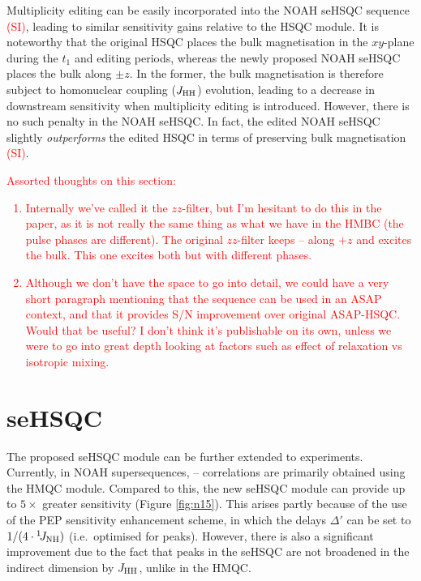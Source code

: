 \documentclass[11pt]{article}
\newcommand*{\carbon}{\ce{^{13}C}}
\newcommand*{\proton}{\ce{^{1}H}}
\newcommand*{\nitrogen}{\ce{^{15}N}}
\newcommand*{\red}[1]{\textcolor{red}{#1}}
\newcommand*{\onejnh}{{}^{1}\!J_{\ce{NH}}}
\newcommand*{\jhh}{J_{\ce{HH}}}
\newcommand*{\figref}[1]{Figure \ref{fig:#1}}
\newcommand*{\sitodo}{\red{(SI)}}
\begin{document}
Multiplicity editing can be easily incorporated into the NOAH seHSQC sequence \sitodo{}, leading to similar sensitivity gains relative to the HSQC module.
It is noteworthy that the original HSQC places the bulk magnetisation in the $xy$-plane during the $t_1$ and editing periods, whereas the newly proposed NOAH seHSQC places the bulk along $\pm z$.
In the former, the bulk magnetisation is therefore subject to homonuclear coupling ($\jhh$) evolution, leading to a decrease in downstream sensitivity when multiplicity editing is introduced.
However, there is no such penalty in the NOAH seHSQC.
In fact, the edited NOAH seHSQC slightly \textit{outperforms} the edited HSQC in terms of preserving bulk magnetisation \sitodo{}.

\red{
    Assorted thoughts on this section:
    \begin{enumerate}
        \item Internally we've called it the $zz$-filter, but I'm hesitant to do this in the paper, as it is not really the same thing as what we have in the HMBC (the pulse phases are different). The original $zz$-filter keeps \carbon{}--\proton{} along $+z$ and excites the bulk. This one excites both but with different phases.
        \item Although we don't have the space to go into detail, we could have a very short paragraph mentioning that the sequence can be used in an ASAP context, and that it provides S/N improvement over original ASAP-HSQC. Would that be useful? I don't think it's publishable on its own, unless we were to go into great depth looking at factors such as effect of relaxation vs isotropic mixing.
    \end{enumerate}
}

\section*{\texorpdfstring{\nitrogen{}}{15N} seHSQC}

The proposed seHSQC module can be further extended to \nitrogen{} experiments.
Currently, in NOAH supersequences, \nitrogen{}--\proton{} correlations are primarily obtained using the HMQC module.\autocite{Kupce2007MRC, Kupce2017ACIE}
Compared to this, the new seHSQC module can provide up to $5\times$ greater sensitivity (\figref{n15}).
This arises partly because of the use of the PEP sensitivity enhancement scheme, in which the delays $\Delta'$ can be set to $1/(4 \cdot \onejnh)$ (i.e.\ optimised for  peaks).
However, there is also a significant improvement due to the fact that peaks in the seHSQC are not broadened in the indirect dimension by $\jhh$, unlike in the HMQC.
\end{document}
